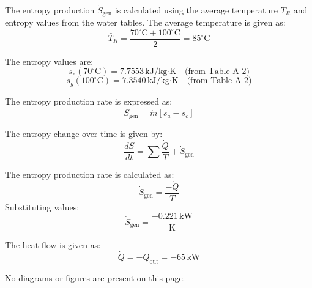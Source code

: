 The entropy production \( \dot{S}_{\text{gen}} \) is calculated using the average temperature \( \bar{T}_R \) and entropy values from the water tables. The average temperature is given as:  
\[
\bar{T}_R = \frac{70^\circ\text{C} + 100^\circ\text{C}}{2} = 85^\circ\text{C}
\]  

The entropy values are:  
\[
s_e(70^\circ\text{C}) = 7.7553 \, \text{kJ/kg·K} \quad \text{(from Table A-2)}
\]  
\[
s_g(100^\circ\text{C}) = 7.3540 \, \text{kJ/kg·K} \quad \text{(from Table A-2)}
\]  

The entropy production rate is expressed as:  
\[
\dot{S}_{\text{gen}} = \dot{m} \left[ s_a - s_c \right]
\]  

The entropy change over time is given by:  
\[
\frac{dS}{dt} = \sum \frac{\dot{Q}}{T} + \dot{S}_{\text{gen}}
\]  

The entropy production rate is calculated as:  
\[
\dot{S}_{\text{gen}} = \frac{-\dot{Q}}{T}
\]  
Substituting values:  
\[
\dot{S}_{\text{gen}} = \frac{-0.221 \, \text{kW}}{\text{K}}
\]  

The heat flow is given as:  
\[
\dot{Q} = -Q_{\text{out}} = -65 \, \text{kW}
\]  

No diagrams or figures are present on this page.